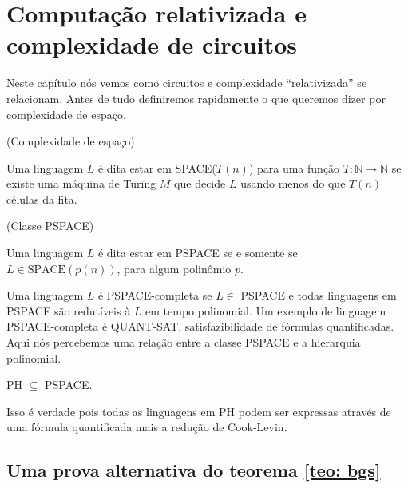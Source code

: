 \chapter{Computação relativizada e complexidade de circuitos}

Neste capítulo nós vemos como circuitos e complexidade ``relativizada'' se relacionam. Antes de tudo definiremos rapidamente o que queremos dizer por complexidade de espaço.

\begin{defi}(Complexidade de espaço)

Uma linguagem $L$ é dita estar em SPACE($T(n)$) para uma função $T: \mathbb{N} \to \mathbb{N}$ se existe uma máquina de Turing $M$ que decide $L$ usando menos do que $T(n)$ células da fita.

\end{defi}

\begin{defi} (Classe PSPACE)

Uma linguagem $L$ é dita estar em PSPACE se e somente se $L \in \text{SPACE}(p(n))$, para algum polinômio $p$.

\end{defi}

Uma linguagem $L$ é PSPACE-completa se $L \in $ PSPACE e todas linguagens em PSPACE são redutíveis à $L$ em tempo polinomial. Um exemplo de linguagem PSPACE-completa é QUANT-SAT, satisfazibilidade de fórmulas quantificadas. Aqui nós percebemos uma relação entre a classe PSPACE e a hierarquia polinomial.

\begin{teo}

    PH $\subseteq$ PSPACE.

\end{teo}

Isso é verdade pois todas as linguagens em PH podem ser expressas através de uma fórmula quantificada mais a redução de Cook-Levin.

\section{Uma prova alternativa do teorema \ref{teo: bgs}}

